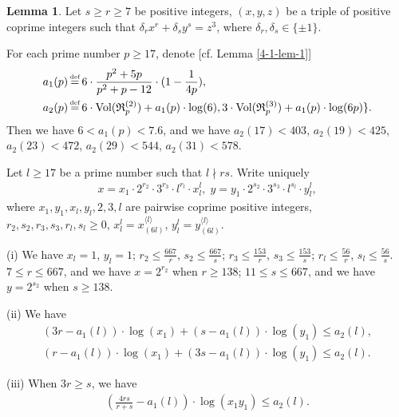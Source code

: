 \documentclass[a4paper, 12pt]{article}
\DeclareMathOperator{\defeq}{\overset{\text{\tiny{def}}}{=}}
\DeclareMathOperator{\Vol}{\text{Vol}}
\newcommand{\lagl}{\langle l \rangle}
\numberwithin{equation}{section}
\theoremstyle{definition}
\newtheorem{lem}[thm]{Lemma}
\begin{document}
\begin{lem} \label{4-2-lem-3}
Let $s \ge r \ge 7$ be positive integers, $(x,y,z)$ be a triple of positive coprime integers such that $\delta_r x^r + \delta_s y^s = z^3$, where $\delta_r,\delta_s \in \{\pm 1\}$. 

For each prime number $p\ge 17$, denote [cf. Lemma \ref{4-1-lem-1}]
\small\begin{align*}
a_1(p) &\defeq 6 \cdot \frac{p^2+5p}{p^2+p-12}\cdot (1-\frac{1}{4p}),  \\
a_2(p) &\defeq 6 \cdot \Vol(\mathfrak R_p^{(2)})  + a_1(p)\cdot \log(6), 3 \cdot \Vol(\mathfrak R_p^{(3)}) + a_1(p)\cdot \log(6p) \} .
\end{align*}\normalsize
Then we have $6 < a_1(p) < 7.6$, and we have 
$a_2(17) < 403$, $a_2(19) < 425$, $a_2(23) < 472$, 
$a_2(29) < 544$, $a_2(31) < 578$.

Let $l\ge 17$ be a prime number such that $l\nmid rs$.
Write uniquely \small\begin{gather*}
x = x_1 \cdot 2^{r_2} \cdot 3^{r_3} \cdot l^{r_l} \cdot x_l^{l}, \;
y = y_1 \cdot 2^{s_2} \cdot 3^{s_3} \cdot l^{s_l} \cdot y_l^{l},
\end{gather*}\normalsize
where $x_1, y_1, x_l, y_l, 2, 3, l$ are pairwise coprime positive integers, $r_2, s_2, r_3, s_3, r_l, s_l \ge 0$, $x_l^l = x_{(6l)}^{\lagl}$, $y_l^l = y_{(6l)}^{\lagl}$.

(i) We have $x_l = 1$, $y_l = 1$;
$r_2 \le \frac{667}{r}$, $s_2 \le \frac{667}{s}$;
$r_3 \le \frac{153}{r}$, $s_3 \le \frac{153}{s}$;
$r_l \le \frac{56}{r}$, $s_l \le \frac{56}{s}$.
$7\le r \le 667$, and we have $x = 2^{r_2}$ when $r \ge 138$;
$11\le s \le 667$, and we have $y = 2^{s_2}$ when $s \ge 138$.

(ii) We have 
\begin{align*}
(3r-a_1(l)) \cdot \log(x_1) + (s-a_1(l))\cdot \log(y_1) \le a_2(l), \\
(r-a_1(l)) \cdot \log(x_1) + (3s-a_1(l))\cdot \log(y_1) \le a_2(l).
\end{align*}

(iii) When $3r \ge s$, we have \begin{align*}
(\frac{4rs}{r+s} - a_1(l) ) \cdot \log(x_1 y_1)  \le a_2(l).
\end{align*}

\end{lem}
\end{document}
